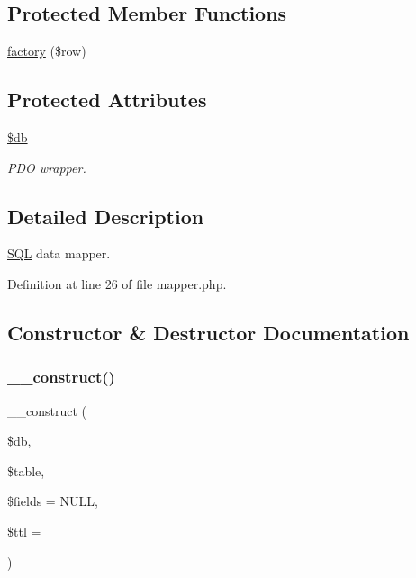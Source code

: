 \subsection*{Protected Member Functions}
\begin{DoxyCompactItemize}
\item 
\hyperlink{class_d_b_1_1_s_q_l_1_1_mapper_a60e4b1320f31f4049ad7867bd739c14d}{factory} (\$row)
\end{DoxyCompactItemize}
\subsection*{Protected Attributes}
\begin{DoxyCompactItemize}
\item 
\hypertarget{class_d_b_1_1_s_q_l_1_1_mapper_a1fa3127fc82f96b1436d871ef02be319}{}\label{class_d_b_1_1_s_q_l_1_1_mapper_a1fa3127fc82f96b1436d871ef02be319} 
\hyperlink{class_d_b_1_1_s_q_l_1_1_mapper_a1fa3127fc82f96b1436d871ef02be319}{\$db}
\begin{DoxyCompactList}\small\item\em P\+DO wrapper. \end{DoxyCompactList}\end{DoxyCompactItemize}


\subsection{Detailed Description}
\hyperlink{class_d_b_1_1_s_q_l}{S\+QL} data mapper. 

Definition at line 26 of file mapper.\+php.



\subsection{Constructor \& Destructor Documentation}
\hypertarget{class_d_b_1_1_s_q_l_1_1_mapper_acbebed6a28c69e88f6a2afe423fbf778}{}\label{class_d_b_1_1_s_q_l_1_1_mapper_acbebed6a28c69e88f6a2afe423fbf778} 
\subsubsection{\texorpdfstring{\+\_\+\+\_\+construct()}{\_\_construct()}}
{\footnotesize\ttfamily \+\_\+\+\_\+construct (\begin{DoxyParamCaption}\item[{\textbackslash{}\hyperlink{class_d_b_1_1_s_q_l}{D\+B\textbackslash{}\+S\+QL}}]{\$db,  }\item[{}]{\$table,  }\item[{}]{\$fields = {\ttfamily NULL},  }\item[{}]{\$ttl = {} }\end{DoxyParamCaption})}

